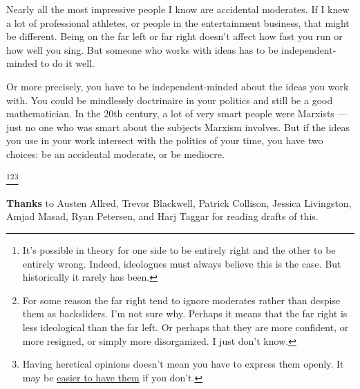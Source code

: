 Nearly all the most impressive people I know are accidental moderates.
If I knew a lot of professional athletes, or people in the entertainment
business, that might be different. Being on the far left or far right
doesn't affect how fast you run or how well you sing. But someone who
works with ideas has to be independent-minded to do it well.

Or more precisely, you have to be independent-minded about the ideas you
work with. You could be mindlessly doctrinaire in your politics and
still be a good mathematician. In the 20th century, a lot of very smart
people were Marxists --- just no one who was smart about the subjects
Marxism involves. But if the ideas you use in your work intersect with
the politics of your time, you have two choices: be an accidental
moderate, or be mediocre.


\footnote{It's possible in theory for one side to be entirely right and
the other to be entirely wrong. Indeed, ideologues must always believe
this is the case. But historically it rarely has been.}\footnote{For some reason the far right tend to ignore moderates rather
than despise them as backsliders. I'm not sure why. Perhaps it means
that the far right is less ideological than the far left. Or perhaps
that they are more confident, or more resigned, or simply more
disorganized. I just don't know.}\footnote{Having heretical opinions doesn't mean you have to express them
openly. It may be \href{say.html}{easier to have them} if you don't.}

\textbf{Thanks} to Austen Allred, Trevor Blackwell, Patrick Collison,
Jessica Livingston, Amjad Masad, Ryan Petersen, and Harj Taggar for
reading drafts of this.
